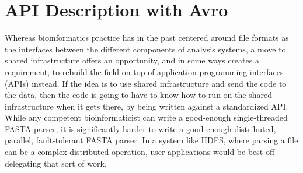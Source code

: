 \documentclass[11pt,proposal]{ucthesis}
\begin{document}



    
    
    
    
    
    
        
    
    

\section{API Description with Avro}

Whereas bioinformatics practice has in the past centered around file formats as the interfaces between the different components of analysis systems, a move to shared infrastructure offers an opportunity, and in some ways creates a requirement, to rebuild the field on top of application programming interfaces (APIs) instead. If the idea is to use shared infrastructure and send the code to the data, then the code is going to have to know how to run on the shared infrastructure when it gets there, by being written against a standardized API. While any competent bioinformaticist can write a good-enough single-threaded FASTA parser, it is significantly harder to write a good enough distributed, parallel, fault-tolerant FASTA parser. In a system like HDFS, where parsing a file can be a complex distributed operation, user applications would be best off delegating that sort of work.
\end{document}
